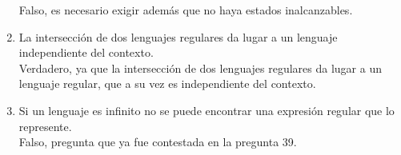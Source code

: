 \begin{enumerate}
        Falso, es necesario exigir además que no haya estados inalcanzables.
    \item La intersección de dos lenguajes regulares da lugar a un lenguaje independiente del contexto.\\

        Verdadero, ya que la intersección de dos lenguajes regulares da lugar a un lenguaje regular, que a su vez es independiente del contexto.
    \item Si un lenguaje es infinito no se puede encontrar una expresión regular que lo represente.\\

        Falso, pregunta que ya fue contestada en la pregunta 39.
\end{enumerate}
